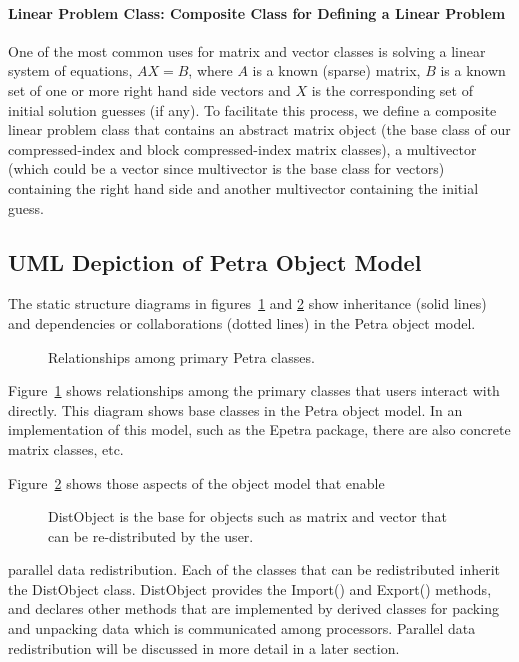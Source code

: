 \documentclass[12pt,relax]{PetraObjectModel}
\begin{document}
\paragraph{Linear Problem Class:  Composite Class for Defining a Linear Problem}

One of the most common uses for matrix and vector classes is solving a linear
system of equations, $AX = B$, where $A$ is a known (sparse) matrix, $B$ is a
known set of one or more right hand side vectors and $X$ is the corresponding
set of initial solution guesses (if any).  To facilitate this process, we
define a composite linear problem class that contains an abstract matrix object
(the base class of our compressed-index and block compressed-index matrix
classes), a multivector (which could be a vector since multivector is the base
class for vectors) containing the right hand side and another multivector
containing the initial guess.

\subsection{UML Depiction of Petra Object Model}

The static structure diagrams in figures~\ref{matvecmap} and \ref{distobj}
show inheritance (solid lines) and dependencies or collaborations (dotted
lines) in the Petra object model.
\begin{figure}[ht]
\begin{center}
\caption{Relationships among primary Petra classes.}
\label{matvecmap}
\end{center}
\end{figure}
Figure~\ref{matvecmap} shows relationships among the primary classes that users
interact with directly.  This
diagram shows base classes in the Petra object model. In an implementation of
this model, such as the Epetra package, there are also concrete matrix classes,
etc.

Figure~\ref{distobj} shows those aspects of the object model that enable
\begin{figure}[ht]
\begin{center}
\caption{DistObject is the base for objects such as matrix and vector that can be re-distributed by the user.}
\label{distobj}
\end{center}
\end{figure}
parallel data redistribution. Each of the classes that can be redistributed
inherit the DistObject class. DistObject provides the Import() and Export()
methods, and declares other methods that are implemented by derived classes for
packing and unpacking data which is communicated among processors. Parallel
data redistribution will be discussed in more detail in a later section.
\end{document}
